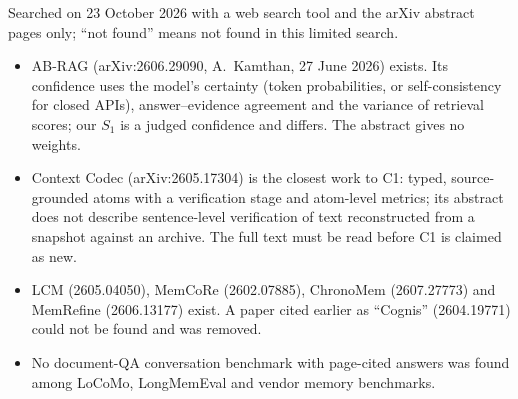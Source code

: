 Searched on 23 October 2026 with a web search tool and the arXiv abstract pages only; ``not found'' means not found in this limited search.
\begin{itemize}
\item AB-RAG (arXiv:2606.29090, A.~Kamthan, 27 June 2026) exists. Its confidence uses the model's certainty (token probabilities, or self-consistency for closed APIs), answer--evidence agreement and the variance of retrieval scores; our $S_1$ is a judged confidence and differs. The abstract gives no weights.
\item Context Codec (arXiv:2605.17304) is the closest work to C1: typed, source-grounded atoms with a verification stage and atom-level metrics; its abstract does not describe sentence-level verification of text reconstructed from a snapshot against an archive. The full text must be read before C1 is claimed as new.
\item LCM (2605.04050), MemCoRe (2602.07885), ChronoMem (2607.27773) and MemRefine (2606.13177) exist. A paper cited earlier as ``Cognis'' (2604.19771) could not be found and was removed.
\item No document-QA conversation benchmark with page-cited answers was found among LoCoMo, LongMemEval and vendor memory benchmarks.
\end{itemize}
